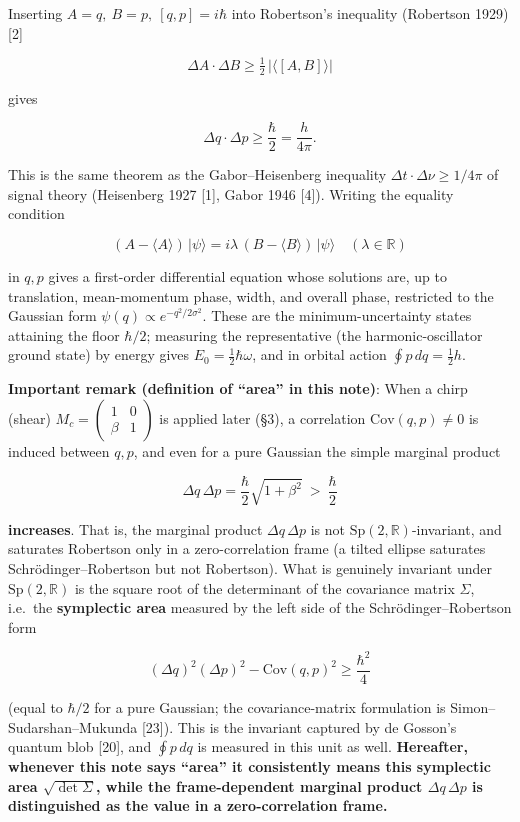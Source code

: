 \documentclass[
]{article}
\begin{document}
Inserting \(A=q,\ B=p,\ [q,p]=i\hbar\) into Robertson's inequality
(Robertson 1929) {[}2{]}

\[\Delta A\cdot\Delta B \ge \tfrac12\,\bigl|\langle[A,B]\rangle\bigr|\]

gives

\[\Delta q\cdot\Delta p \ge \frac{\hbar}{2}=\frac{h}{4\pi}.\]

This is the same theorem as the Gabor--Heisenberg inequality
\(\Delta t\cdot\Delta\nu\ge 1/4\pi\) of signal theory (Heisenberg 1927
{[}1{]}, Gabor 1946 {[}4{]}). Writing the equality condition

\[(A-\langle A\rangle)\,|\psi\rangle = i\lambda\,(B-\langle B\rangle)\,|\psi\rangle\quad(\lambda\in\mathbb{R})\]

in \(q,p\) gives a first-order differential equation whose solutions
are, up to translation, mean-momentum phase, width, and overall phase,
restricted to the Gaussian form \(\psi(q)\propto e^{-q^2/2\sigma^2}\).
These are the minimum-uncertainty states attaining the floor
\(\hbar/2\); measuring the representative (the harmonic-oscillator
ground state) by energy gives \(E_0=\tfrac12\hbar\omega\), and in
orbital action \(\oint p\,dq=\tfrac12 h\).

\textbf{Important remark (definition of ``area'' in this note)}: When a
chirp (shear) \(M_c=\begin{pmatrix}1&0\\\beta&1\end{pmatrix}\) is
applied later (§3), a correlation \(\mathrm{Cov}(q,p)\neq0\) is induced
between \(q,p\), and even for a pure Gaussian the simple marginal
product

\[\Delta q\,\Delta p=\frac{\hbar}{2}\sqrt{1+\beta^2}\ >\ \frac{\hbar}{2}\]

\textbf{increases}. That is, the marginal product \(\Delta q\,\Delta p\)
is not \(\mathrm{Sp}(2,\mathbb{R})\)-invariant, and saturates Robertson
only in a zero-correlation frame (a tilted ellipse saturates
Schrödinger--Robertson but not Robertson). What is genuinely invariant
under \(\mathrm{Sp}(2,\mathbb{R})\) is the square root of the
determinant of the covariance matrix \(\Sigma\), i.e.~the
\textbf{symplectic area} measured by the left side of the
Schrödinger--Robertson form

\[(\Delta q)^2(\Delta p)^2-\mathrm{Cov}(q,p)^2 \ge \frac{\hbar^2}{4}\]

(equal to \(\hbar/2\) for a pure Gaussian; the covariance-matrix
formulation is Simon--Sudarshan--Mukunda {[}23{]}). This is the
invariant captured by de Gosson's quantum blob {[}20{]}, and
\(\oint p\,dq\) is measured in this unit as well. \textbf{Hereafter,
whenever this note says ``area'' it consistently means this symplectic
area \(\sqrt{\det\Sigma}\), while the frame-dependent marginal product
\(\Delta q\,\Delta p\) is distinguished as the value in a
zero-correlation frame.}
\end{document}
